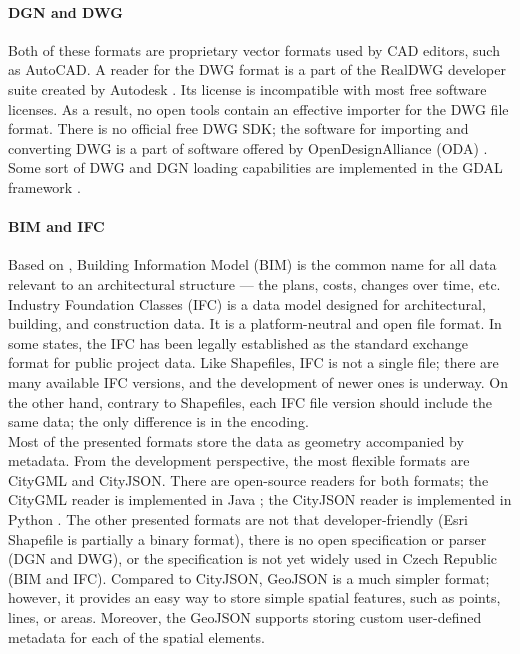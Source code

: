 \paragraph{DGN and DWG}
Both of these formats are proprietary vector formats used by CAD editors, such as AutoCAD. A reader for the DWG format is a part of the RealDWG developer suite created by Autodesk \cite{autodeskRealDWG}. Its license is incompatible with most free software licenses. As a result, no open tools contain an effective importer for the DWG file format. There is no official free DWG SDK; the software for importing and converting DWG is a part of software offered by OpenDesignAlliance (ODA) \cite{alliance1998open}. Some sort of DWG and DGN loading capabilities are implemented in the GDAL framework \cite{GDALframework}.

\paragraph{BIM and IFC}
Based on \cite{TANG2017311}, Building Information Model (BIM) is the common name for all data relevant to an architectural structure --- the plans, costs, changes over time, etc. Industry Foundation Classes (IFC) is a data model designed for architectural, building, and construction data. It is a platform-neutral and open file format. In some states, the IFC has been legally established as the standard exchange format for public project data. Like Shapefiles, IFC is not a single file; there are many available IFC versions, and the development of newer ones is underway. On the other hand, contrary to Shapefiles, each IFC file version should include the same data; the only difference is in the encoding. \\

Most of the presented formats store the data as geometry accompanied by metadata. From the development perspective, the most flexible formats are CityGML and CityJSON. There are open-source readers for both formats; the CityGML reader is implemented in Java \cite{cityGMLimport}; the CityJSON reader is implemented in Python \cite{cjio}. The other presented formats are not that developer-friendly (Esri Shapefile is partially a binary format), there is no open specification or parser (DGN and DWG), or the specification is not yet widely used in Czech Republic (BIM and IFC). Compared to CityJSON, GeoJSON is a much simpler format; however, it provides an easy way to store simple spatial features, such as points, lines, or areas.  Moreover, the GeoJSON supports storing custom user-defined metadata for each of the spatial elements.  


